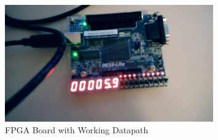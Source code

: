 \documentclass{article}
\begin{document}
\begin{figure}[H]
  \centering
  \includegraphics[width=0.8\textwidth]{Fib11_Demo.jpg}
  \caption{FPGA Board with Working Datapath}
  \label{fig:fpga-demo}
\end{figure}
\end{document}

